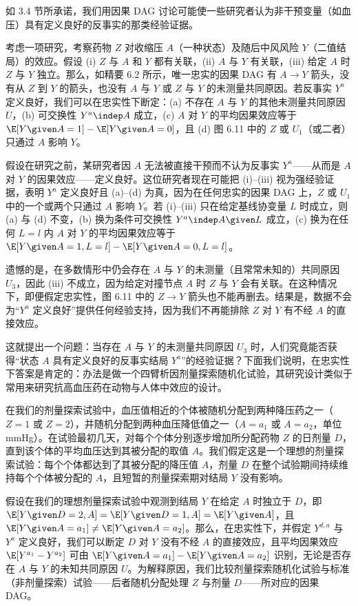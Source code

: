 \begin{finepoint}[再论非干预变量的因果效应]
如 3.4 节所承诺，我们用因果 DAG 讨论可能使一些研究者认为非干预变量（如血压）具有定义良好的反事实的那类经验证据。

考虑一项研究，考察药物 $Z$ 对收缩压 $A$（一种状态）及随后中风风险 $Y$（二值结局）的效应。假设 (i) $Z$ 与 $A$ 和 $Y$ 都有关联，(ii) $A$ 与 $Y$ 有关联，(iii) 给定 $A$ 时 $Z$ 与 $Y$ 独立。那么，如精要 6.2 所示，唯一忠实的因果 DAG 有 $A\to Y$ 箭头，没有从 $Z$ 到 $Y$ 的箭头，也没有 $A$ 与 $Y$ 或 $Z$ 与 $Y$ 的未测量共同原因。若反事实 $Y^{a}$ 定义良好，我们可以在忠实性下断定：(a) 不存在 $A$ 与 $Y$ 的其他未测量共同原因 $U$，(b) 可交换性 $Y^{a}\indep A$ 成立，(c) $A$ 对 $Y$ 的平均因果效应等于 $\E[Y\given A=1]-\E[Y\given A=0]$，且 (d) 图 6.11 中的 $Z$ 或 $U_1$（或二者）只通过 $A$ 影响 $Y$。

假设在研究之前，某研究者因 $A$ 无法被直接干预而不认为反事实 $Y^{a}$——从而是 $A$ 对 $Y$ 的因果效应——定义良好。这位研究者现在可能把 (i)--(iii) 视为强经验证据，表明 $Y^{a}$ 定义良好且 (a)--(d) 为真，因为在任何忠实的因果 DAG 上，$Z$ 或 $U_1$ 中的一个或两个只通过 $A$ 影响 $Y$。若 (i)--(iii) 只在给定基线协变量 $L$ 时成立，则 (a) 与 (d) 不变，(b) 换为条件可交换性 $Y^{a}\indep A\given L$ 成立，(c) 换为在任何 $L=l$ 内 $A$ 对 $Y$ 的平均因果效应等于 $\E[Y\given A=1,L=l]-\E[Y\given A=0,L=l]$。

遗憾的是，在多数情形中仍会存在 $A$ 与 $Y$ 的未测量（且常常未知的）共同原因 $U_3$，因此 (iii) 不成立，因为给定对撞节点 $A$ 时 $Z$ 与 $Y$ 会有关联。在这种情况下，即便假定忠实性，图 6.11 中的 $Z\to Y$ 箭头也不能再删去。结果是，数据不会为“$Y^{a}$ 定义良好”提供任何经验支持，因为我们不再能排除 $Z$ 对 $Y$ 有不经 $A$ 的直接效应。

这就提出一个问题：当存在 $A$ 与 $Y$ 的未测量共同原因 $U_3$ 时，人们究竟能否获得“状态 $A$ 具有定义良好的反事实结局 $Y^{a}$”的经验证据？下面我们说明，在忠实性下答案是肯定的：办法是做一个四臂析因剂量探索随机化试验，其研究设计类似于常用来研究抗高血压药在动物与人体中效应的设计。

在我们的剂量探索试验中，血压值相近的个体被随机分配到两种降压药之一（$Z=1$ 或 $Z=2$），并随机分配到两种血压降低值之一（$A=a_1$ 或 $A=a_2$，单位 mmHg）。在试验最初几天，对每个个体分别逐步增加所分配药物 $Z$ 的日剂量 $D$，直到该个体的平均血压达到其被分配的取值 $A$。我们假定这是一个理想的剂量探索试验：每个个体都达到了其被分配的降压值 $A$，剂量 $D$ 在整个试验期间持续维持每个个体被分配的 $A$，且短暂的剂量探索期对结局 $Y$ 没有影响。

假设在我们的理想剂量探索试验中观测到结局 $Y$ 在给定 $A$ 时独立于 $D$，即 $\E[Y\given D=2,A]=\E[Y\given D=1,A]=\E[Y\given A]$，且 $\E[Y\given A=a_1]\neq\E[Y\given A=a_2]$。那么，在忠实性下，并假定 $Y^{d,a}$ 与 $Y^{a}$ 定义良好，我们可以断定 $D$ 对 $Y$ 没有不经 $A$ 的直接效应，且平均因果效应 $\E[Y^{a_1}-Y^{a_2}]$ 可由 $\E[Y\given A=a_1]-\E[Y\given A=a_2]$ 识别，无论是否存在 $A$ 与 $Y$ 的未知共同原因 $U$。为解释原因，我们比较剂量探索随机化试验与标准（非剂量探索）试验——后者随机分配处理 $Z$ 与剂量 $D$——所对应的因果 DAG。


\end{finepoint}
